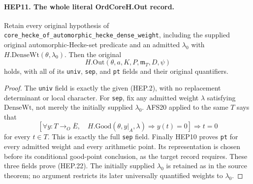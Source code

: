 \paragraph{HEP11. The whole literal OrdCoreH.Out record.}
\label{claim:HEP11}
Retain every original hypothesis of
\texttt{core\_hecke\_of\_automorphic\_hecke\_dense\_weight},
including the supplied original automorphic-Hecke-set predicate
and an admitted $\lambda_0$ with $H.\mathrm{DenseWt}(\theta,\lambda_0)$.
Then the original
\[
           H.\mathrm{Out}(\theta,a,K,P,\mathfrak m_T,D,\psi)
 \tag{HEP.22}
\]
holds, with all of its \texttt{univ}, \texttt{sep}, and \texttt{pt}
fields and their original quantifiers.
\begin{proof}
The \texttt{univ} field is exactly the given (HEP.2), with no
replacement determinant or local character.
For \texttt{sep}, fix any admitted weight $\lambda$ satisfying
$\mathrm{DenseWt}$, not merely the initially supplied $\lambda_0$.
AFS20 applied to the same $T$ says that
\[
 \left[\forall y:T\to_O\overline E,\quad
 H.\mathrm{Good}(\theta,y|_A,\lambda)\Rightarrow y(t)=0\right]
                      \Longrightarrow t=0
 \tag{HEP.23}
\]
for every $t\in T$.  This is exactly the full \texttt{sep} field.
Finally HEP10 proves \texttt{pt} for every admitted weight and
every arithmetic point.  Its representation is chosen before its
conditional good-point conclusion, as the target record requires.
These three fields prove (HEP.22).  The initially supplied
$\lambda_0$ is retained as in the source theorem; no argument
restricts its later universally quantified weights to $\lambda_0$.
\end{proof}

